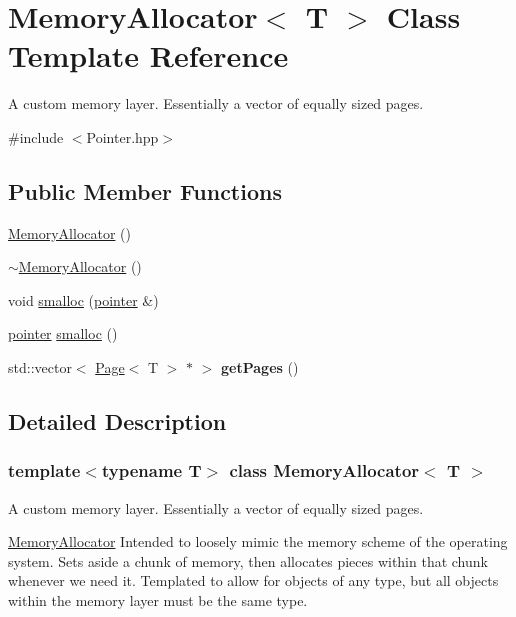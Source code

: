 \hypertarget{class_memory_allocator}{}\section{Memory\+Allocator$<$ T $>$ Class Template Reference}
\label{class_memory_allocator}


A custom memory layer. Essentially a vector of equally sized pages.  




{\ttfamily \#include $<$Pointer.\+hpp$>$}

\subsection*{Public Member Functions}
\begin{DoxyCompactItemize}
\item 
\hyperlink{class_memory_allocator_a9c7ca60e8881012d0311c98689359c91}{Memory\+Allocator} ()
\item 
\hyperlink{class_memory_allocator_a06ba8aa77baa4fea0096da7f0c720e7b}{$\sim$\+Memory\+Allocator} ()
\item 
void \hyperlink{class_memory_allocator_a0afd80ad46c6631bc7986d8a3fe36f3c}{smalloc} (\hyperlink{structpointer}{pointer} \&)
\item 
\hyperlink{structpointer}{pointer} \hyperlink{class_memory_allocator_a8712abdd481153bf70734258bfc3f8b9}{smalloc} ()
\item 
\mbox{\label{class_memory_allocator_a528a642157870b5d8e667a0cf4fcebfd}} 
std\+::vector$<$ \hyperlink{class_page}{Page}$<$ T $>$ $\ast$ $>$ {\bfseries get\+Pages} ()
\end{DoxyCompactItemize}


\subsection{Detailed Description}
\subsubsection*{template$<$typename T$>$\newline
class Memory\+Allocator$<$ T $>$}

A custom memory layer. Essentially a vector of equally sized pages. 

\hyperlink{class_memory_allocator}{Memory\+Allocator} Intended to loosely mimic the memory scheme of the operating system. Sets aside a chunk of memory, then allocates pieces within that chunk whenever we need it. Templated to allow for objects of any type, but all objects within the memory layer must be the same type. 


